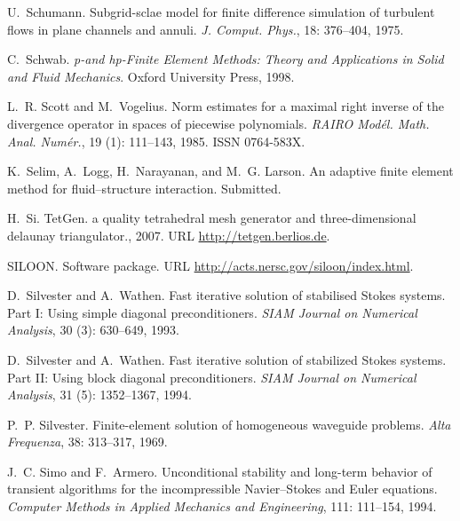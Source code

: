 \begin{thebibliography}{467}
U.~Schumann.
\newblock Subgrid-sclae model for finite difference simulation of turbulent
  flows in plane channels and annuli.
\newblock \emph{J. Comput. Phys.}, 18: 376--404, 1975.

C.~Schwab.
\newblock \emph{{p}-and {hp}-Finite Element Methods: Theory and Applications in
  Solid and Fluid Mechanics}.
\newblock Oxford University Press, 1998.

L.~R. Scott and M.~Vogelius.
\newblock Norm estimates for a maximal right inverse of the divergence operator
  in spaces of piecewise polynomials.
\newblock \emph{RAIRO Mod\'el. Math. Anal. Num\'er.}, 19 (1):
  111--143, 1985.
\newblock ISSN 0764-583X.

K.~Selim, A.~Logg, H.~Narayanan, and M.~G. Larson.
\newblock An adaptive finite element method for fluid--structure interaction.
\newblock Submitted.

H.~Si.
\newblock Tet{G}en. a quality tetrahedral mesh generator and three-dimensional
  delaunay triangulator., 2007.
\newblock URL \url{http://tetgen.berlios.de}.

SILOON.
\newblock Software package.
\newblock URL \url{http://acts.nersc.gov/siloon/index.html}.

D.~Silvester and A.~Wathen.
\newblock Fast iterative solution of stabilised {S}tokes systems. {P}art {I}:
  {U}sing simple diagonal preconditioners.
\newblock \emph{SIAM Journal on Numerical Analysis}, 30 (3):
  630--649, 1993.

D.~Silvester and A.~Wathen.
\newblock Fast iterative solution of stabilized {S}tokes systems. {P}art {II}:
  {U}sing block diagonal preconditioners.
\newblock \emph{SIAM Journal on Numerical Analysis}, 31 (5):
  1352--1367, 1994.

P.~P. Silvester.
\newblock Finite-element solution of homogeneous waveguide problems.
\newblock \emph{Alta Frequenza}, 38: 313--317, 1969.

J.~C. Simo and F.~Armero.
\newblock Unconditional stability and long-term behavior of transient
  algorithms for the incompressible {N}avier--{S}tokes and {E}uler equations.
\newblock \emph{Computer Methods in Applied Mechanics and Engineering},
  111: 111--154, 1994.


\end{thebibliography}
